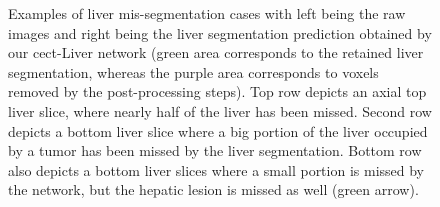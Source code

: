 \documentclass[]{article}
\newcommand{\pplfont}[1]{{\fontfamily{ppl}\selectfont #1}}
\begin{document}
\begin{figure}[ht!]
\begin{minipage}{0.45\linewidth}
	\end{minipage}
	\caption{Examples of liver mis-segmentation cases with left being the raw images and right being the liver segmentation prediction obtained by our \pplfont{\ac{cect}-Liver} network (green area corresponds to the retained liver segmentation, whereas the purple area corresponds to voxels removed by the post-processing steps). Top row depicts an axial top liver slice, where nearly half of the liver has been missed. Second row depicts a bottom liver slice where a big portion of the liver occupied by a tumor has been missed by the liver segmentation. Bottom row also depicts a bottom liver slices where a small portion is missed by the network, but the hepatic lesion is missed as well (green arrow).}
	\label{fig:LITS_networkMisSeg_extremSlices}
\end{figure}
\end{document}
